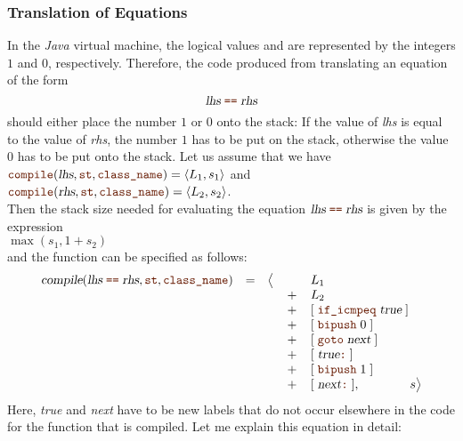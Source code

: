 \subsubsection{Translation of Equations}
In the \textsl{Java} virtual machine, the logical values  and  are represented by
the integers $1$ and $0$, respectively.  Therefore, the code produced from translating an equation of the form 
\[ \textsl{lhs}\; \mytt{==} \;\textsl{rhs} \]
should either place the number $1$ or $0$ onto the stack: If the value of \textsl{lhs} is equal to the value of
\textsl{rhs}, the number $1$ has to be put on the stack, otherwise the value $0$ has to be put onto the stack.
Let us assume that we have
\\[0.2cm]
\hspace*{1.3cm}
$\mytt{compile}(\textsl{lhs}, \mytt{st}, \mytt{class\_name}) = \pair(L_1, s_1)$ \quad and \quad
$\mytt{compile}(\textsl{rhs}, \mytt{st}, \mytt{class\_name}) = \pair(L_2, s_2)$.
\\[0.2cm]
Then the stack size needed for evaluating the equation $\textsl{lhs}\; \mytt{==} \;\textsl{rhs}$ is given by
the expression 
\\[0.2cm]
\hspace*{1.3cm}
$\max(s_1, 1 + s_2)$
\\[0.2cm]
and the function  can be specified as follows:
\[
   \begin{array}[t]{lcccl}
   \textsl{compile}(\textsl{lhs}\;\mytt{==}\;\textsl{rhs}, \mytt{st}, \mytt{class\_name}) & = & 
         \bigl\langle & \quad & L_1  \\
   &&& + & L_2 \\
   &&& + & [ \;\mytt{if\_icmpeq}\; \textsl{true} \; ]  \\
   &&& + & [ \;\mytt{bipush}\;0\; ]  \\
   &&& + & [ \;\mytt{goto}\;\textsl{next}\; ]  \\
   &&& + & [ \;\textsl{true}\mytt{:}\; ]  \\
   &&& + & [ \;\mytt{bipush}\;1\; ]  \\
   &&& + & [ \;\textsl{next}\mytt{:}\; ], \qquad\qquad s \bigr\rangle
   \end{array}
\]
Here, \textsl{true} and \textsl{next} have to be new labels that do not occur elsewhere in the code for the
function that is compiled.  Let me explain this equation in detail:
